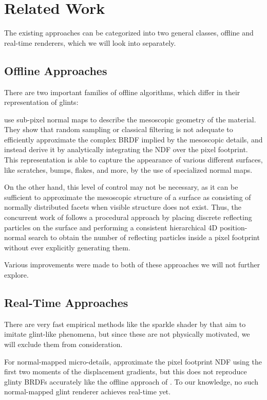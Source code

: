 \section{Related Work}
\label{sec:related-work}

The existing approaches can be categorized into two general classes, offline and real-time renderers, which we will look into separately.


\subsection{Offline Approaches}
\label{sec:related-offline}
%
There are two important families of offline algorithms, which differ in their representation of glints:

\textcite{yan2014} use sub-pixel normal maps to describe the mesoscopic geometry of the material.
%
They show that random sampling or classical filtering is not adequate to efficiently approximate the complex BRDF implied by the mesoscopic details, and instead derive it by analytically integrating the NDF over the pixel footprint.
%
This representation is able to capture the appearance of various different surfaces, like scratches, bumps, flakes, and more, by the use of specialized normal maps.

On the other hand, this level of control may not be necessary, as it can be sufficient to approximate the mesoscopic structure of a surface as consisting of normally distributed facets when visible structure does not exist. 
%
Thus, the concurrent work of \textcite{jakob2014} follows a procedural approach by placing discrete reflecting particles on the surface and performing a consistent hierarchical 4D position-normal search to obtain the number of reflecting particles inside a pixel footprint without ever explicitly generating them.

Various improvements were made to both of these approaches we will not further explore.

\subsection{Real-Time Approaches}
\label{sec:related-realtime}
%
There are very fast empirical methods like the sparkle shader by \textcite{wang2016} that aim to imitate glint-like phenomena, but since these are not physically motivated, we will exclude them from consideration.

For normal-mapped micro-details,\textcite{olano2010, dupuy2013} approximate the pixel footprint NDF using the first two moments of the displacement gradients, but this does not reproduce glinty BRDFs accurately like the offline approach of \textcite{yan2014}.
%
To our knowledge, no such normal-mapped glint renderer achieves real-time yet.

